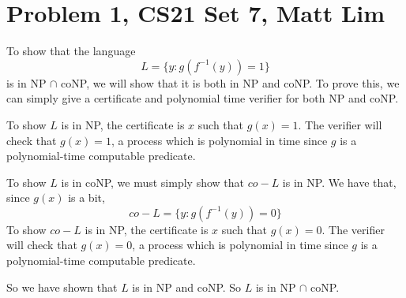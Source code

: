 \documentclass{article}
\begin{document}



\section*{Problem 1, CS21 Set 7, Matt Lim}
To show that the language
\[ L = \{y: g(f^{-1}(y)) = 1\} \]
is in NP $\cap$ coNP, we will show that it is both in NP and coNP.
To prove this, we can simply give a certificate and polynomial time verifier
for both NP and coNP.

To show $L$ is in NP, the certificate is $x$ such that
$g(x) = 1$. The verifier will check that $g(x) = 1$, a process which is
polynomial in time since $g$ is a polynomial-time computable predicate.

To show $L$ is in coNP, we must simply show that $co-L$ is in NP. We have that,
since $g(x)$ is a bit,
\[ co-L = \{y: g(f^{-1}(y)) = 0\} \]
To show $co-L$ is in NP, the certificate is $x$ such that
$g(x) = 0$. The verifier will check that $g(x) = 0$, a process which is
polynomial in time since $g$ is a polynomial-time computable predicate.

So we have shown that $L$ is in NP and coNP. So $L$ is in NP $\cap$ coNP.
\newpage

\end{document}
